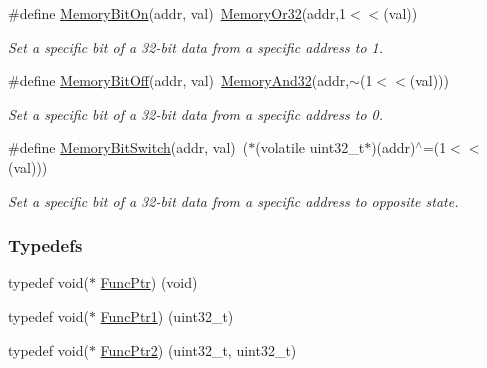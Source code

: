 \begin{DoxyCompactItemize}
\#define \mbox{\hyperlink{a00020_a99a602346038b54068758ef00c42d1b6}{Memory\+Bit\+On}}(addr,  val)~\mbox{\hyperlink{a00020_a27874a97deab7cecdde5ddecf466e31e}{Memory\+Or32}}(addr,1$<$$<$(val))
\begin{DoxyCompactList}\small\item\em Set a specific bit of a 32-\/bit data from a specific address to 1. \end{DoxyCompactList}\item 
\#define \mbox{\hyperlink{a00020_a04c34919a950117ae7da2dc5a235622b}{Memory\+Bit\+Off}}(addr,  val)~\mbox{\hyperlink{a00020_ad87cedffcaadc51db22594fce55173d4}{Memory\+And32}}(addr,$\sim$(1$<$$<$(val)))
\begin{DoxyCompactList}\small\item\em Set a specific bit of a 32-\/bit data from a specific address to 0. \end{DoxyCompactList}\item 
\#define \mbox{\hyperlink{a00020_ae49e41753dbce64185d380d307ade78d}{Memory\+Bit\+Switch}}(addr,  val)~($\ast$(volatile uint32\+\_\+t$\ast$)(addr)$^\wedge$=(1$<$$<$(val)))
\begin{DoxyCompactList}\small\item\em Set a specific bit of a 32-\/bit data from a specific address to opposite state. \end{DoxyCompactList}\end{DoxyCompactItemize}
\subsubsection*{Typedefs}
\begin{DoxyCompactItemize}
\item 
typedef void($\ast$ \mbox{\hyperlink{a00020_a3d987633d7a3ca10c14905a807b62eb1}{Func\+Ptr}}) (void)
\item 
typedef void($\ast$ \mbox{\hyperlink{a00020_a0891965816a5b721b07f7bebefaf7430}{Func\+Ptr1}}) (uint32\+\_\+t)
\item 
typedef void($\ast$ \mbox{\hyperlink{a00020_a331a88eeefe11112bb8fe1b43dd777b8}{Func\+Ptr2}}) (uint32\+\_\+t, uint32\+\_\+t)
\end{DoxyCompactItemize}

